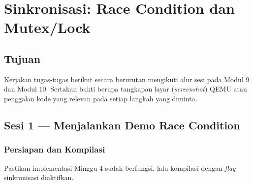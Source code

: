 
\chapter{Sinkronisasi: Race Condition dan Mutex/Lock}
\label{chap:handson-05}

\section{Tujuan}

Kerjakan tugas-tugas berikut secara berurutan mengikuti alur sesi pada Modul 9 dan Modul 10. Sertakan bukti berupa tangkapan layar (\textit{screenshot}) QEMU atau penggalan kode yang relevan pada setiap langkah yang diminta.

\section{Sesi 1 — Menjalankan Demo Race Condition}

\subsection{Persiapan dan Kompilasi}

Pastikan implementasi Minggu 4 sudah berfungsi, lalu kompilasi dengan \textit{flag} sinkronisasi diaktifkan.

